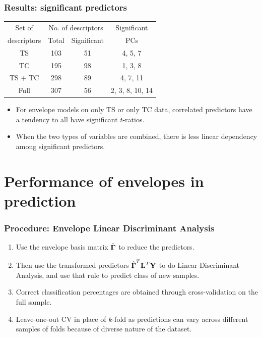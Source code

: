 \documentclass[handout,10pt]{beamer}
\begin{document}
\begin{frame}
\frametitle{Results: significant predictors}
\begin{scriptsize}
\begin{table}\centering
    \begin{tabular}{|c|c|c|c|}\hline
    Set of      & \multicolumn{2}{c|}{No. of descriptors} & Significant\\\cline{2-3}
    descriptors & Total              & Significant & PCs\\\hline\hline
    TS          & 103                & 51         & 4, 5, 7 \\\hline
    TC          & 195                & 98         & 1, 3, 8\\\hline
    TS + TC     & 298                & 89         & 4, 7, 11\\\hline
    Full        & 307                & 56         &  2, 3, 8, 10, 14\\\hline
    \end{tabular}
\end{table}
\end{scriptsize}

\begin{itemize}
\item For envelope models on only TS or only TC data, correlated predictors have a tendency to all have significant $t$-ratios.
\item When the two types of variables are combined, there is less linear dependency among significant predictors.
\end{itemize}
\end{frame}
\section{Performance of envelopes in prediction}

\begin{frame}
\frametitle{Procedure: Envelope Linear Discriminant Analysis}
\begin{enumerate}
\item Use the envelope basis matrix $\hat{{\boldsymbol{\Gamma}}}$ to reduce the predictors.
\vspace{.2cm}
\item Then use the transformed predictors $\hat{{\boldsymbol{\Gamma}}}^T{\mathbf{L}}^T{\mathbf{Y}}$ to do Linear Discriminant Analysis, and use that rule to predict class of new samples.
\vspace{.2cm}
\item Correct classification percentages are obtained through cross-validation on the full sample.
\vspace{.2cm}
\item Leave-one-out CV in place of $k$-fold as predictions can vary across different samples of folds because of diverse nature of the dataset.
\end{enumerate}
\end{frame}
\end{document}
